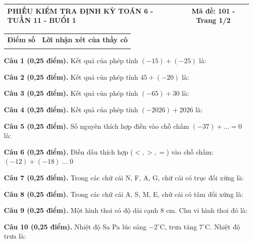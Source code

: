 \documentclass[12pt,a4paper]{article}
\begin{document}
\pagestyle{empty}
\noindent
\begin{tabularx}{\linewidth}{|X|c|}
\hline
\textbf{PHIẾU KIỂM TRA ĐỊNH KỲ TOÁN 6 - TUẦN 11 - BUỔI 1} & \textbf{Mã đề: 101 - Trang 1/2} \\
\hline
\end{tabularx}

\vspace{1.0mm}

\noindent
\begin{tabularx}{\linewidth}{|p{3.2cm}|X|}
\hline
\centering\textbf{Điểm số} & \centering\textbf{Lời nhận xét của thầy cô} \tabularnewline
\rule{0pt}{1.8cm} & \\
\hline
\end{tabularx}

\vspace{1.0mm}
\noindent\textbf{Câu 1 (0,25 điểm).} Kết quả của phép tính $(-15) + (-25)$ là: \par\vspace{0.25mm}
\noindent\textbf{Câu 2 (0,25 điểm).} Kết quả của phép tính $45 + (-20)$ là: \par\vspace{0.25mm}
\noindent\textbf{Câu 3 (0,25 điểm).} Kết quả của phép tính $(-65) + 30$ là: \par\vspace{0.25mm}
\noindent\textbf{Câu 4 (0,25 điểm).} Kết quả của phép tính $(-2026) + 2026$ là: \par\vspace{0.25mm}
\noindent\textbf{Câu 5 (0,25 điểm).} Số nguyên thích hợp điền vào chỗ chấm $(-37) + \dots = 0$ là: \par\vspace{0.25mm}
\noindent\textbf{Câu 6 (0,25 điểm).} Điền dấu thích hợp ($<, >, =$) vào chỗ chấm: $(-12) + (-18) \; \dots \; 0$ \shortans{<}\par\vspace{0.25mm}
\noindent\textbf{Câu 7 (0,25 điểm).} Trong các chữ cái N, F, A, G, chữ cái có trục đối xứng là: \par\vspace{0.25mm}
\noindent\textbf{Câu 8 (0,25 điểm).} Trong các chữ cái A, S, M, E, chữ cái có tâm đối xứng là: \par\vspace{0.25mm}
\noindent\textbf{Câu 9 (0,25 điểm).} Một hình thoi có độ dài cạnh $8\text{ cm}$. Chu vi hình thoi đó là: \par\vspace{0.25mm}
\noindent\textbf{Câu 10 (0,25 điểm).} Nhiệt độ Sa Pa lúc sáng $-2^\circ\text{C}$, trưa tăng $7^\circ\text{C}$. Nhiệt độ trưa là: \par\vspace{0.25mm}
\end{document}
